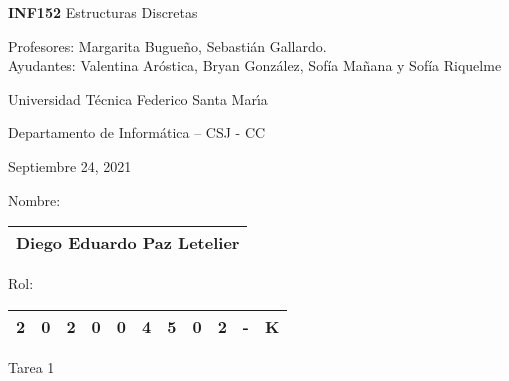 \documentclass[letterpaper,10pt]{article}
\begin{document}
\thispagestyle{empty}
 	
\begin{minipage}[t]{0.6\textwidth}

{\LARGE \textbf{INF152} Estructuras Discretas}

{\large Profesores: Margarita Bugueño, Sebastián Gallardo.}\\
{\large Ayudantes: Valentina Aróstica, Bryan González, Sofía Mañana y Sofía Riquelme}

Universidad T\'ecnica Federico Santa Mar\'{\i}a

Departamento de Inform\'atica -- CSJ - CC 

Septiembre 24, 2021

\end{minipage}
\hfill
\begin{minipage}[t]{0.3\textwidth}
Nombre:

\begin{tabular}{|c|}\hline
Diego Eduardo Paz Letelier\\\hline
\end{tabular}

\vspace{0.1cm}

Rol:

\begin{tabular}{|c|c|c|c|c|c|c|c|c|c|c|}\hline
2 & 0 & 2 & 0 & 0 & 4 & 5 & 0 & 2 & - & K\\\hline
\end{tabular}
\end{minipage}

\vspace{0.3cm}

\begin{center}
    \huge Tarea 1
\end{center}
\end{document}
